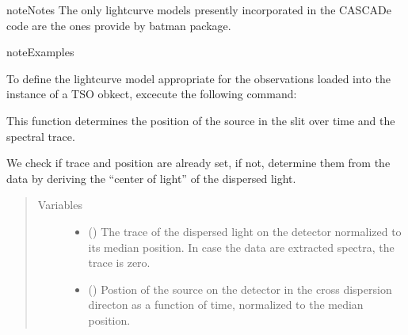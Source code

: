 \documentclass[a4paper,10pt,english]{sphinxmanual}
\begin{document}
\begin{fulllineitems}
\begin{fulllineitems}
\begin{sphinxadmonition}{note}{Notes}
The only lightcurve models presently incorporated in the CASCADe code
are the ones provide by batman package.
\end{sphinxadmonition}

\begin{sphinxadmonition}{note}{Examples}

To define the lightcurve model appropriate for the observations
loaded into the instance of a TSO obkect, excecute the
following command:

%
\begin{sphinxVerbatim}[commandchars=\\\{\}]
\end{sphinxVerbatim}
\end{sphinxadmonition}

\end{fulllineitems}


\begin{fulllineitems}
\label{\detokenize{cascade.TSO:cascade.TSO.TSO.TSOSuite.determine_source_position}}
This function determines the position of the source in the slit
over time and the spectral trace.

We check if trace and position are already set, if not, determine them
from the data by deriving the “center of light” of the dispersed
light.
\begin{quote}\begin{description}
\item[{Variables}] \leavevmode\begin{itemize}
\item {} 
 () \textendash{} The trace of the dispersed light on the detector normalized
to its median position. In case the data are extracted spectra,
the trace is zero.

\item {} 
 () \textendash{} Postion of the source on the detector in the cross dispersion
directon as a function of time, normalized to the
median position.


\end{itemize}
\end{description}
\end{quote}
\end{fulllineitems}
\end{fulllineitems}
\end{document}
